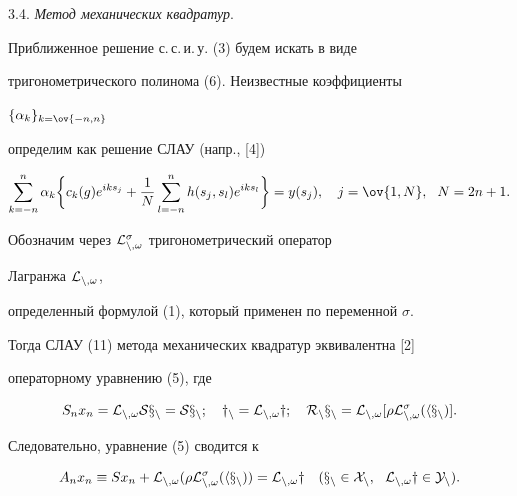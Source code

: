 3.4. {\it Метод механических квадратур}. 


Приближенное решение с.\,с.\,и.\,у. (3) будем искать в виде 


тригонометрического полинома (6). Неизвестные коэффициенты 


$\{\alpha_k\}_{k=\ov{-n,n}}$ 


определим как решение СЛАУ (напр., [4]) 


\begin{equation} 


\sum^n_{k=-n}\alpha_k\bigg\{c_k(g)e^{iks_j}+\frac{1}{N} 


\sum^n_{l=-n}h(s_j,s_l)e^{iks_l}\bigg\}= 


y(s_j),\quad j=\ov{1,N}, \ \ N=2n+1. 


\end{equation} 


 


Обозначим через $\cal L^\sigma_{n,\omega}$ тригонометрический оператор 


Лагранжа $\cal L_{n,\omega}$, 


определенный формулой (1), который применен по переменной $\sigma$. 


Тогда СЛАУ (11) метода механических квадратур эквивалентна [2] 


операторному уравнению (5), где 


$$ 


S_n x_n=\cal L_{n,\omega}S x_n=S x_n;\quad 


y_n=\cal L_{n,\omega}y;\quad 


R_n x_n=\cal L_{n,\omega}[\rho\cal L^\sigma_{n,\omega}(h x_n)]. 


$$ 


Следовательно, уравнение (5) сводится к 


\begin{equation} 


A_n x_n\equiv S x_n+\cal L_{n,\omega}(\rho\cal L^\sigma_{n,\omega} 


(h x_n))=\cal L_{n,\omega}y\quad 


(x_n\in X_n,\ \ \cal L_{n,\omega}y\in Y_n). 


\end{equation} 


 


